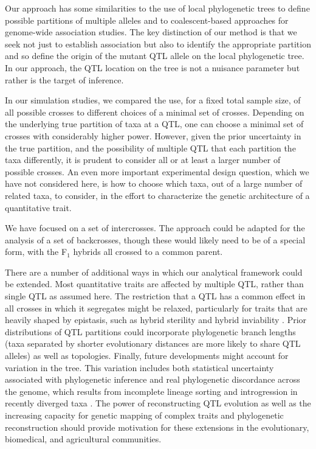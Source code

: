 \documentclass[12pt,letterpaper]{article}
\begin{document}
Our approach has some similarities to the use of local phylogenetic
trees to define possible partitions of multiple alleles
\citep{Pan2009, Zhang2012}
and to coalescent-based approaches \citep{Zollner2005} for
genome-wide association studies. The key distinction of our method is
that we seek not just to establish association but also to identify
the appropriate partition and so define the origin of the mutant QTL
allele on the local phylogenetic tree. In our approach, the QTL
location on the tree is not a nuisance parameter but rather is the
target of inference. 

In our simulation studies, we compared the use, for a fixed total
sample size, of all possible crosses to different choices of a minimal
set of crosses.  Depending on the underlying true partition of taxa at
a QTL, one can choose a minimal set of crosses with considerably
higher power.  However, given the prior uncertainty in the true
partition, and the possibility of multiple QTL that each partition the
taxa differently, it is prudent to consider all or at
least a larger number of possible crosses.  An even more important
experimental design question, which we have not considered here, is
how to choose which taxa, out of a large number of related taxa, to
consider, in the effort to characterize the genetic architecture of a
quantitative trait.

We have focused on a set of intercrosses.  The approach could be
adapted for the analysis of a set of backcrosses, though these would
likely need to be of a special form, with the F$_1$ hybrids all
crossed to a common parent.

There are a number of additional ways in which our analytical
framework could be extended.
Most quantitative traits are affected by multiple QTL, rather
than single QTL as assumed here. The restriction that a QTL has a
common effect in all crosses in which it segregates might be
relaxed, particularly for traits that are heavily shaped by epistasis, such as
hybrid sterility and hybrid inviability \citep{Coyne2004}. Prior
distributions of QTL partitions could incorporate phylogenetic branch
lengths (taxa separated by shorter evolutionary distances are more
likely to share
QTL alleles) as well as topologies. Finally, future developments might
account for variation in the tree. This variation includes both
statistical uncertainty associated with phylogenetic inference and
real phylogenetic discordance across the genome, which results from
incomplete lineage sorting and introgression in recently diverged taxa
\citep{Pamilo1988, Maddison1997, Pollard2006, White2009}. The power of
reconstructing QTL evolution as well as the increasing capacity for
genetic mapping of complex traits and phylogenetic reconstruction
should provide motivation for these extensions in the evolutionary,
biomedical, and agricultural communities.
\end{document}

